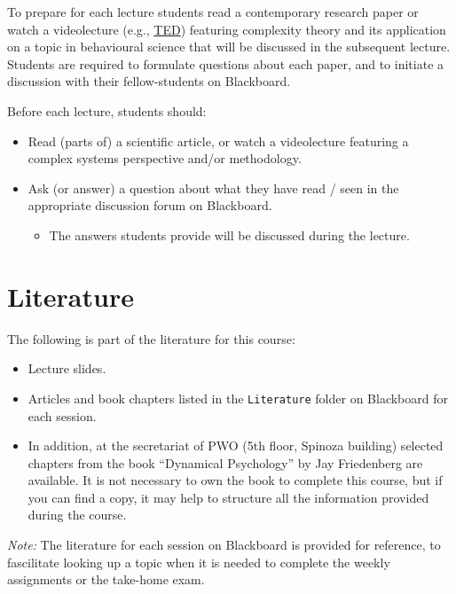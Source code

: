 \documentclass[]{book}
\providecommand{\tightlist}{%
  \setlength{\itemsep}{0pt}\setlength{\parskip}{0pt}}
\let\stdsection\section
\renewcommand\section{\newpage\stdsection}
\begin{document}
To prepare for each lecture students read a contemporary research paper
or watch a videolecture (e.g., \href{http://www.ted.com}{TED}) featuring
complexity theory and its application on a topic in behavioural science
that will be discussed in the subsequent lecture. Students are required
to formulate questions about each paper, and to initiate a discussion
with their fellow-students on Blackboard.

Before each lecture, students should:

\begin{itemize}
\tightlist
\item
  Read (parts of) a scientific article, or watch a videolecture
  featuring a complex systems perspective and/or methodology.
\item
  Ask (or answer) a question about what they have read / seen in the
  appropriate discussion forum on Blackboard.

  \begin{itemize}
  \tightlist
  \item
    The answers students provide will be discussed during the lecture.
  \end{itemize}
\end{itemize}

\section{Literature}\label{literature}

The following is part of the literature for this course:

\begin{itemize}
\tightlist
\item
  Lecture slides.
\item
  Articles and book chapters listed in the \texttt{Literature} folder on
  Blackboard for each session.
\item
  In addition, at the secretariat of PWO (5th floor, Spinoza building)
  selected chapters from the book ``Dynamical Psychology'' by Jay
  Friedenberg are available. It is not necessary to own the book to
  complete this course, but if you can find a copy, it may help to
  structure all the information provided during the course.
\end{itemize}

\emph{Note:} The literature for each session on Blackboard is provided
for reference, to fascilitate looking up a topic when it is needed to
complete the weekly assignments or the take-home exam.
\end{document}

